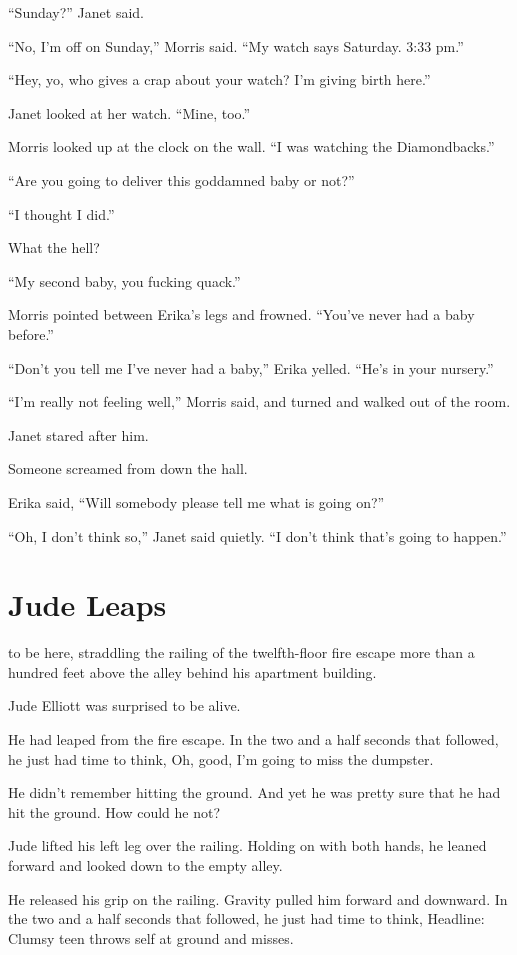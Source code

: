 “Sunday?” Janet said.

“No, I’m off on Sunday,” Morris said. “My watch says Saturday. 3:33 pm.”

“Hey, yo, who gives a crap about your watch? I’m giving birth here.”

Janet looked at her watch. “Mine, too.”

Morris looked up at the clock on the wall. “I was watching the Diamondbacks.”

“Are you going to deliver this goddamned baby or not?”

“I thought I did.”

What the hell?

“My second baby, you fucking quack.”

Morris pointed between Erika’s legs and frowned. “You’ve never had a baby before.”

“Don’t you tell me I’ve never had a baby,” Erika yelled. “He’s in your nursery.”

“I’m really not feeling well,” Morris said, and turned and walked out of the room.

Janet stared after him.

Someone screamed from down the hall.

Erika said, “Will somebody please tell me what is going on?”

“Oh, I don’t think so,” Janet said quietly. “I don’t think that’s going to happen.”



\chapter{Jude Leaps}

 to be here, straddling the railing of the twelfth-floor fire escape more than a hundred feet above the alley behind his apartment building.

Jude Elliott was surprised to be alive.

He had leaped from the fire escape. In the two and a half seconds that followed, he just had time to think, Oh, good, I’m going to miss the dumpster.

He didn’t remember hitting the ground. And yet he was pretty sure that he had hit the ground. How could he not?

Jude lifted his left leg over the railing. Holding on with both hands, he leaned forward and looked down to the empty alley.

He released his grip on the railing. Gravity pulled him forward and downward. In the two and a half seconds that followed, he just had time to think, Headline: Clumsy teen throws self at ground and misses.

